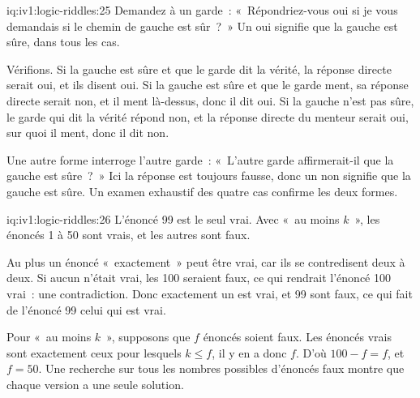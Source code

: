 \begin{solution}{iq:iv1:logic-riddles:25}
Demandez à un garde~: «~Répondriez-vous oui si je vous demandais si le chemin de gauche est sûr~?~» Un oui signifie que la gauche est sûre, dans tous les cas.

Vérifions. Si la gauche est sûre et que le garde dit la vérité, la réponse directe serait oui, et ils disent oui. Si la gauche est sûre et que le garde ment, sa réponse directe serait non, et il ment là-dessus, donc il dit oui. Si la gauche n'est pas sûre, le garde qui dit la vérité répond non, et la réponse directe du menteur serait oui, sur quoi il ment, donc il dit non.

Une autre forme interroge l'autre garde~: «~L'autre garde affirmerait-il que la gauche est sûre~?~» Ici la réponse est toujours fausse, donc un non signifie que la gauche est sûre. Un examen exhaustif des quatre cas confirme les deux formes.

\end{solution}

\begin{solution}{iq:iv1:logic-riddles:26}
L'énoncé 99 est le seul vrai. Avec «~au moins $k$~», les énoncés 1 à 50 sont vrais, et les autres sont faux.

Au plus un énoncé «~exactement~» peut être vrai, car ils se contredisent deux à deux. Si aucun n'était vrai, les 100 seraient faux, ce qui rendrait l'énoncé 100 vrai~: une contradiction. Donc exactement un est vrai, et 99 sont faux, ce qui fait de l'énoncé 99 celui qui est vrai.

Pour «~au moins $k$~», supposons que $f$ énoncés soient faux. Les énoncés vrais sont exactement ceux pour lesquels $k \le f$, il y en a donc $f$. D'où $100 - f = f$, et $f = 50$. Une recherche sur tous les nombres possibles d'énoncés faux montre que chaque version a une seule solution.

\end{solution}

